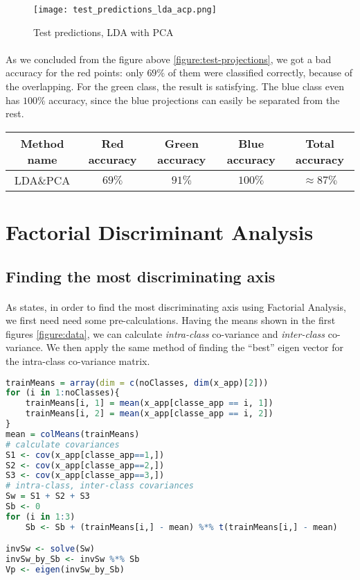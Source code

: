 \begin{figure}[H]
    \centering
    \texttt{[image: test\_predictions\_lda\_acp.png]}
    \caption{Test predictions, LDA with PCA}
    \label{figure:test-predictions-lda-pca}
\end{figure}

\paragraph{}
As we concluded from the figure above \ref{figure:test-projections}, we got a bad accuracy for the red points: only $69\%$ of them were classified correctly, because of the overlapping.
For the green class, the result is satisfying.
The blue class even has $100\%$ accuracy, since the blue projections can easily be separated from the rest.

\begin{center}
    \begin{tabular}{ |c|c|c|c|c| }
        \hline
        Method name & Red accuracy & Green accuracy & Blue accuracy & Total accuracy \\
        \hline
        LDA\&PCA & $69\%$ & $91\%$ & $100\%$ & $\approx 87\%$ \\
        \hline
    \end{tabular}
\end{center}

\clearpage

\section{Factorial Discriminant Analysis}

\subsection{Finding the most discriminating axis}
\paragraph{}
As \cite{dimensionality_reduction} states, in order to find the most discriminating axis using Factorial Analysis, we first need need some pre-calculations.
Having the means shown in the first figures \ref{figure:data}, we can calculate \emph{intra-class} co-variance and \emph{inter-class} co-variance.
We then apply the same method of finding the ``best'' eigen vector for the intra-class co-variance matrix.

\begin{lstlisting}[language=R, caption=Finding best discriminant axis using FDA]
trainMeans = array(dim = c(noClasses, dim(x_app)[2]))
for (i in 1:noClasses){
    trainMeans[i, 1] = mean(x_app[classe_app == i, 1])
    trainMeans[i, 2] = mean(x_app[classe_app == i, 2])
}
mean = colMeans(trainMeans)
# calculate covariances
S1 <- cov(x_app[classe_app==1,])
S2 <- cov(x_app[classe_app==2,])
S3 <- cov(x_app[classe_app==3,])
# intra-class, inter-class covariances
Sw = S1 + S2 + S3
Sb <- 0
for (i in 1:3)
    Sb <- Sb + (trainMeans[i,] - mean) %*% t(trainMeans[i,] - mean)

invSw <- solve(Sw)
invSw_by_Sb <- invSw %*% Sb
Vp <- eigen(invSw_by_Sb)
\end{lstlisting}

